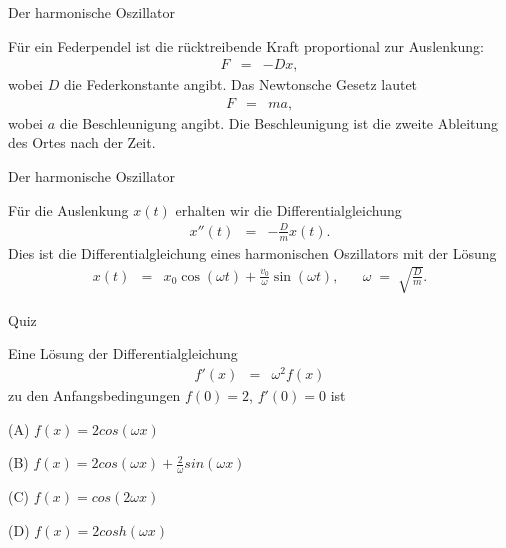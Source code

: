 \documentclass[german]{beamer}
\newcommand{\bq}{\begin{eqnarray*}}
\newcommand{\eq}{\end{eqnarray*}}
\begin{document}
\begin{frame}{Der harmonische Oszillator}

\begin{example}
F\"ur ein Federpendel ist die r\"ucktreibende Kraft proportional zur Auslenkung:
\bq
 F & = & - D x,
\eq
wobei $D$ die Federkonstante angibt.
Das Newtonsche Gesetz lautet
\bq
 F & = & m a,
\eq
wobei $a$ die Beschleunigung angibt. 
Die Beschleunigung ist die zweite Ableitung des Ortes nach der Zeit.
\end{example}

\end{frame}

\begin{frame}{Der harmonische Oszillator}

F\"ur die Auslenkung $x(t)$ erhalten wir die Differentialgleichung
\bq
 x''\left(t\right) & = & - \frac{D}{m} x\left(t\right).
\eq
Dies ist die Differentialgleichung eines harmonischen Oszillators mit der L\"osung
\bq
 x\left(t\right) & = & x_0 \cos\left(\omega t\right) +\frac{v_0}{\omega} \sin\left(\omega t\right),
 \;\;\;\;\;\;
 \omega \; = \; \sqrt{\frac{D}{m}}.
\eq

\end{frame}

\begin{frame}{Quiz}

Eine L\"osung der Differentialgleichung
\bq
 f'(x) & = & \omega^2 f(x)
\eq
zu den Anfangsbedingungen $f(0)=2$, $f'(0)=0$ ist
\begin{description}
\item{(A)} $f(x) = 2 cos(\omega x)$
\item{(B)} $f(x) = 2 cos(\omega x) + \frac{2}{\omega} sin(\omega x)$
\item{(C)} $f(x) = cos(2 \omega x)$
\item{(D)} $f(x) = 2 cosh(\omega x)$
\end{description}

\end{frame}

\end{document}
